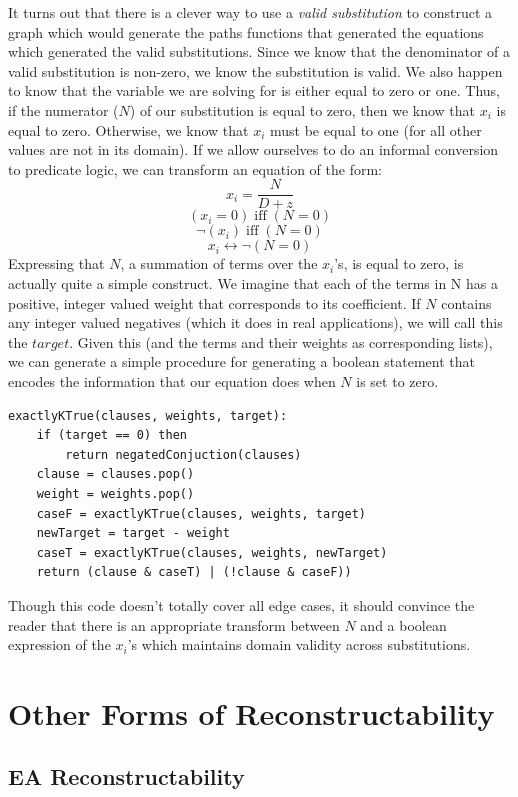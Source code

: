 \documentclass[11pt,a4paper]{report}
\begin{document}
It turns out that there is a clever way to use a \emph{valid substitution} to construct a graph which would generate the paths functions that generated the equations which generated the valid substitutions.
Since we know that the denominator of a valid substitution is non-zero, we know the substitution is valid.  
We also happen to know that the variable we are solving for is either equal to zero or one.  
Thus, if the numerator (\(N\)) of our substitution is equal to zero, then we know that \(x_i\) is equal to zero.  
Otherwise, we know that \(x_i\) must be equal to one (for all other values are not in its domain). 
If we allow ourselves to do an informal conversion to predicate logic, we can transform an equation of the form:
 \[x_i = \frac{N}{D + z}\] 
 \[(x_i = 0) \; \text{iff} \; (N = 0)\]
 \[\neg(x_i) \; \text{iff} \; (N = 0)\]
 \[x_i  \leftrightarrow  \neg(N = 0)\]
Expressing that \(N\), a summation of terms over the \(x_i\)'s, is equal to zero, is actually quite a simple construct. 
We imagine that each of the terms in N has a positive, integer valued weight that corresponds to its coefficient. 
If \(N\) contains any integer valued negatives (which it does in real applications), we will call this the \(target\).
Given this (and the terms and their weights as corresponding lists), we can generate a simple procedure for generating a boolean statement that encodes the information that our equation does when \(N\) is set to zero.

\begin{lstlisting}[frame=single]
exactlyKTrue(clauses, weights, target):
	if (target == 0) then
		return negatedConjuction(clauses)
	clause = clauses.pop()
	weight = weights.pop()
	caseF = exactlyKTrue(clauses, weights, target)
	newTarget = target - weight
	caseT = exactlyKTrue(clauses, weights, newTarget)
	return (clause & caseT) | (!clause & caseF))
\end{lstlisting}

Though this code doesn't totally cover all edge cases, it should convince the reader that there is an appropriate transform between \(N\) and a boolean expression of the \(x_i\)'s which maintains domain validity across substitutions.


\section{Other Forms of Reconstructability}
\subsection{EA Reconstructability}
\end{document}
